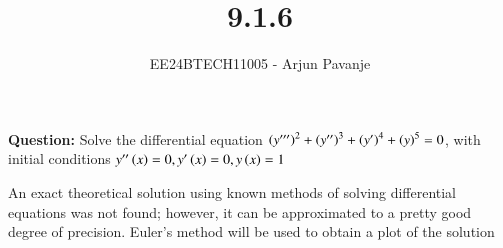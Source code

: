 \documentclass[journal]{IEEEtran}
\begin{document}

\vspace{3cm}

\title{9.1.6}
\author{EE24BTECH11005 - Arjun Pavanje}
{\let\newpage\relax\maketitle}
\textbf{Question:}
Solve the differential equation $\left(y^{\prime \prime \prime}\right)^2 + \left(y^{\prime \prime}\right)^3 + \left(y^{\prime}\right)^4 + \left(y\right)^5 = 0$, with initial conditions $y^{\prime \prime}\left(x\right)=0, y^{\prime}\left(x\right)=0, y\left(x\right)=1$

\solution
An exact theoretical solution using known methods of solving differential equations was not found; however, it can be approximated to a pretty good degree of precision. Euler's method will be used to obtain a plot of the solution\\
\end{document}
